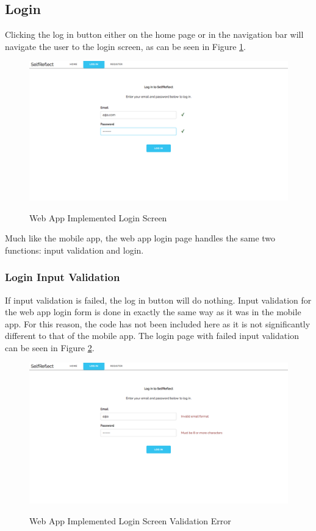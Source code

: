 \documentclass[11pt,openright,a4paper]{report}
\begin{document}
\subsection{Login}
Clicking the log in button either on the home page or in the navigation bar will navigate the user to the login screen, as can be seen in Figure \ref{fig:webloginimpl}.

\begin{figure}[ht]
\centering
\caption{Web App Implemented Login Screen}
\includegraphics[width=.8\textwidth]{i/webloginimpl.png}
\label{fig:webloginimpl}
\end{figure}

Much like the mobile app, the web app login page handles the same two functions: input validation and login.

\newpage
\subsubsection{Login Input Validation}
If input validation is failed, the log in button will do nothing. Input validation for the web app login form is done in exactly the same way as it was in the mobile app. For this reason, the code has not been included here as it is not significantly different to that of the mobile app. The login page with failed input validation can be seen in Figure \ref{fig:webloginerror}.

\begin{figure}[ht]
\centering
\caption{Web App Implemented Login Screen Validation Error}
\includegraphics[width=.8\textwidth]{i/webloginerror.png}
\label{fig:webloginerror}
\end{figure}
\end{document}
